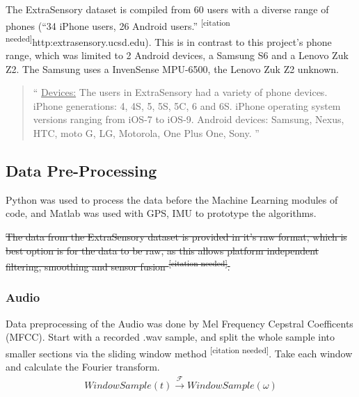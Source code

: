 \documentclass{UoNMCHA}
\newcommand{\citationneeded}{\textsuperscript{\color{blue} [citation needed]}}
\newcommand{\inlineQuote}[1]{``#1''}
\newcommand{\fancyquote}[1]{\begin{quotation}\inlineQuote{#1}\end{quotation}}
\numberwithin{equation}{section}
\begin{document}
The ExtraSensory dataset is compiled from 60 users with a diverse range of phones (\inlineQuote{34 iPhone users, 26 Android users.}\citationneeded http:\/\/extrasensory.ucsd.edu\/). This is in contrast to this project's phone range, which was limited to 2 Android devices, a Samsung S6 and a Lenovo Zuk Z2. The Samsung uses a InvenSense MPU-6500, the Lenovo Zuk Z2 unknown.

\fancyquote{
    \underline{Devices:}
    The users in ExtraSensory had a variety of phone devices.
    iPhone generations: 4, 4S, 5, 5S, 5C, 6 and 6S.
    iPhone operating system versions ranging from iOS-7 to iOS-9.
    Android devices: Samsung, Nexus, HTC, moto G, LG, Motorola, One Plus One, Sony.
}


\subsection{Data Pre-Processing}
Python was used to process the data before the Machine Learning modules of code, and Matlab was used with GPS, IMU to prototype the algorithms. 


 \sout{The data from the ExtraSensory dataset is provided in it's raw format, which is best option is for the data to be raw, as this allows platform independent filtering, smoothing and sensor fusion\citationneeded.} 

\subsubsection{Audio}
Data preprocessing of the Audio was done by Mel Frequency Cepstral Coefficents (MFCC). Start with a recorded .wav sample, and split the whole sample into smaller sections via the sliding window method\citationneeded. Take each window and calculate the Fourier transform.
\begin{gather}%
    WindowSample(t) \xrightarrow{\mathscr{F}}  WindowSample(\omega)
\end{gather}



\end{document}
